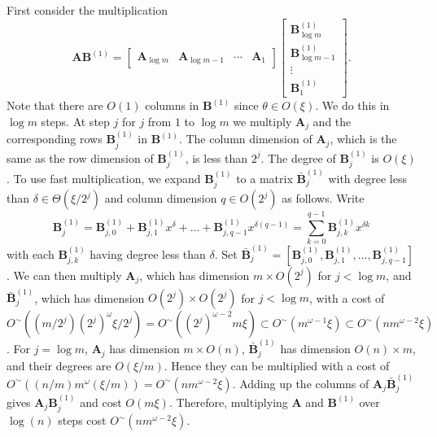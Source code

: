 \begin{pf}
First consider the multiplication 
\[
\mathbf{A}\mathbf{B}^{\left(1\right)}=\left[\begin{array}{cccc}
\mathbf{A}_{\log m} & \mathbf{A}_{\log m-1} & \cdots & \mathbf{A}_{1}\end{array}\right]\left[\begin{array}{l}
\mathbf{B}_{\log m}^{\left(1\right)}\\
\mathbf{B}_{\log m-1}^{\left(1\right)}\\
\vdots\\
\mathbf{B}_{1}^{\left(1\right)}
\end{array}\right].
\]
Note that there are $O\left(1\right)$ columns in $\mathbf{B}^{(1)}$
since $\theta\in O\left(\xi\right)$. We do this in $\log m$ steps.
At step $j$ for $j$ from $1$ to $\log m$ we multiply $\mathbf{A}_{j}$
and the corresponding rows $\mathbf{B}_{j}^{(1)}$ in $\mathbf{B}^{(1)}$.
The column dimension of $\mathbf{A}_{j}$, which is the same as the
row dimension of $\mathbf{B}_{j}^{(1)}$, is less than $2^{j}$. The
degree of $\mathbf{B}_{j}^{(1)}$ is $O\left(\xi\right)$. To use
fast multiplication, we expand $\mathbf{B}_{j}^{(1)}$ to a matrix
$\bar{\mathbf{B}}_{j}^{(1)}$ with degree less than $\delta\in\Theta(\xi/2^{j})$
and column dimension $q\in O(2^{j})$ as follows. Write 
\[
\mathbf{B}_{j}^{(1)}=\mathbf{B}_{j,0}^{(1)}+\mathbf{B}_{j,1}^{(1)}x^{\delta}+\dots+\mathbf{B}_{j,q-1}^{(1)}x^{\delta(q-1)}=\sum_{k=0}^{q-1}\mathbf{B}_{j,k}^{(1)}x^{\delta k}
\]
 with each $\mathbf{B}_{j,k}^{(1)}$ having degree less than $\delta.$
Set $\bar{\mathbf{B}}_{j}^{(1)}=\left[\mathbf{B}_{j,0}^{(1)},\mathbf{B}_{j,1}^{(1)},\dots,\mathbf{B}_{j,q-1}^{(1)}\right]$.
We can then multiply $\mathbf{A}_{j}$, which has dimension $m\times O(2^{j})$
for $j<\log m$, and $\bar{\mathbf{B}}_{j}^{(1)}$, which has dimension
$O(2^{j})\times O(2^{j})$ for $j<\log m$, with a cost of $O^{\sim}\left((m/2^{j})\left(2^{j}\right)^{\omega}\xi/2^{j}\right)=O^{\sim}\left(\left(2^{j}\right)^{\omega-2}m\xi\right)\subset O^{\sim}\left(m^{\omega-1}\xi\right)\subset O^{\sim}(nm^{\omega-2}\xi)$.
For $j=\log m$, $\mathbf{A}_{j}$ has dimension $m\times O\left(n\right)$,
$\bar{\mathbf{B}}_{j}^{\left(1\right)}$ has dimension $O\left(n\right)\times m$,
and their degrees are $O\left(\xi/m\right)$. Hence they can be multiplied
with a cost of $O^{\sim}\left((n/m)m^{\omega}(\xi/m)\right)=O^{\sim}\left(nm^{\omega-2}\xi\right)$.
Adding up the columns of $\mathbf{A}_{j}\bar{\mathbf{B}}_{j}^{(1)}$
gives $\mathbf{A}_{j}\mathbf{B}_{j}^{(1)}$ and cost $O(m\xi)$. Therefore,
multiplying $\mathbf{A}$ and $\mathbf{B}^{(1)}$ over $\log(n)$
steps cost $O^{\sim}\left(nm^{\omega-2}\xi\right)$. 


\end{pf}
